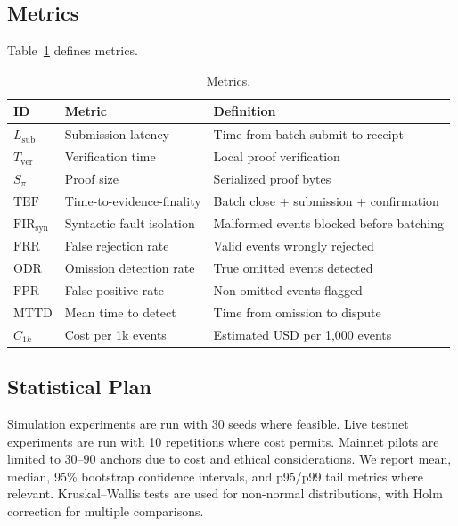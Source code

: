 \documentclass[journal]{IEEEtran}
\begin{document}
\subsection{Metrics}
Table~\ref{tab:metrics} defines metrics.

\begin{table}[!t]
\centering
\caption{Metrics.}
\label{tab:metrics}
\renewcommand{\arraystretch}{1.1}
\small
\begin{tabular}{@{}p{1.2cm} p{2.2cm} p{4.2cm}@{}}
\toprule
\textbf{ID} & \textbf{Metric} & \textbf{Definition} \\
\midrule
$L_{\mathrm{sub}}$ & Submission latency & Time from batch submit to receipt \\
$T_{\mathrm{ver}}$ & Verification time & Local proof verification \\
$S_{\pi}$ & Proof size & Serialized proof bytes \\
$\mathrm{TEF}$ & Time-to-evidence-finality & Batch close + submission + confirmation \\
$\mathrm{FIR}_{\mathrm{syn}}$ & Syntactic fault isolation & Malformed events blocked before batching \\
$\mathrm{FRR}$ & False rejection rate & Valid events wrongly rejected \\
$\mathrm{ODR}$ & Omission detection rate & True omitted events detected \\
$\mathrm{FPR}$ & False positive rate & Non-omitted events flagged \\
$\mathrm{MTTD}$ & Mean time to detect & Time from omission to dispute \\
$C_{1k}$ & Cost per 1k events & Estimated USD per 1{,}000 events \\
\bottomrule
\end{tabular}
\end{table}

\subsection{Statistical Plan}
Simulation experiments are run with 30 seeds where feasible. Live testnet experiments are run with 10 repetitions where cost permits. Mainnet pilots are limited to 30--90 anchors due to cost and ethical considerations. We report mean, median, 95\% bootstrap confidence intervals, and p95/p99 tail metrics where relevant. Kruskal--Wallis tests are used for non-normal distributions, with Holm correction for multiple comparisons.

\end{document}
